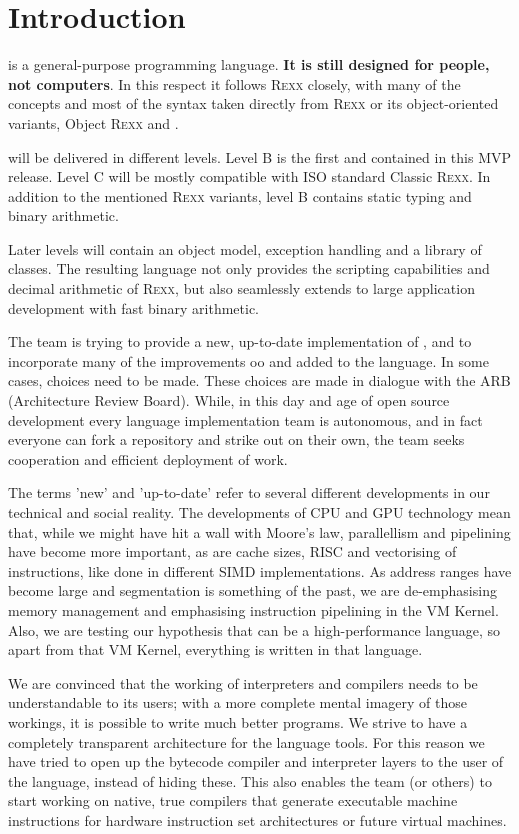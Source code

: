 \chapter{Introduction}
\crexx{} is a general-purpose programming language. \textbf{It is
  still designed for
people, not computers}. In this respect it follows R\textsc{exx} closely, with
many of the concepts and most of the syntax taken directly from R\textsc{exx}
or its object-oriented variants, Object R\textsc{exx} and \nr{}.

\crexx{} will be delivered in different levels. Level B is the first and
contained in this MVP release. Level C will be mostly compatible with
ISO standard Classic \textsc{Rexx}. 
In addition to the mentioned \textsc{Rexx} variants, \crexx{} level B contains 
static typing and binary arithmetic.

Later levels will contain an object model, exception
handling and a library of classes. The resulting language not only provides the scripting
capabilities and decimal arithmetic of R\textsc{exx}, but also seamlessly
extends to large application development with fast binary arithmetic.

The \crexx{} team is trying to provide a new, up-to-date
implementation of \rexx{}, and to incorporate many of the improvements
oo\rexx{} and \nr{} added to the language. In some cases, choices
need to be made. These choices are made in dialogue with the \rexx ARB
(Architecture Review Board). While, in this day and age of open source
development every language implementation team is autonomous, and in
fact everyone can fork a repository and strike out on their own, the
\crexx{} team seeks cooperation and efficient deployment of work.

The terms 'new' and 'up-to-date' refer to several different
developments in our technical and social reality. The developments of
CPU and GPU technology mean that, while we might have hit a wall with
Moore's law, parallellism and pipelining have become more important,
as are cache sizes, RISC and vectorising of instructions, like done in
different SIMD implementations. As address ranges have become large
and segmentation is something of the past, we are de-emphasising
memory management and emphasising instruction pipelining in the
\crexx{} VM Kernel. Also, we are testing our hypothesis that \rexx{}
can be a high-performance language, so apart from that VM Kernel,
everything is written in that language.

We are convinced that the working of interpreters and compilers needs
to be understandable to its users; with a more complete mental imagery
of those workings, it is possible to write much better programs. We
strive to have a completely transparent architecture for the language
tools. For this reason we have tried to open up the bytecode compiler
and interpreter layers to the user of the language, instead of hiding
these. This also enables the team (or others) to start working on
native, true compilers that generate executable machine instructions
for hardware instruction set architectures or future virtual machines.

